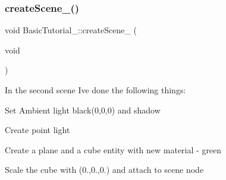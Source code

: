 \subsubsection{\texorpdfstring{create\+Scene\+\_()}{createScene\_01()}}
{\footnotesize\ttfamily void Basic\+Tutorial\+\_\+::create\+Scene\+\_ (\begin{DoxyParamCaption}\item[{void}]{ }\end{DoxyParamCaption})\hspace{0.3cm}{\ttfamily [protected]}}



In the second scene I\textquotesingle{}ve done the following things\+: 


\begin{DoxyEnumerate}
\item Set Ambient light black(0,0,0) and shadow
\item Create point light
\item Create a plane and a cube entity with new material -\/ green
\item Scale the cube with (0.,0.,0.) and attach to scene node 
\end{DoxyEnumerate}

